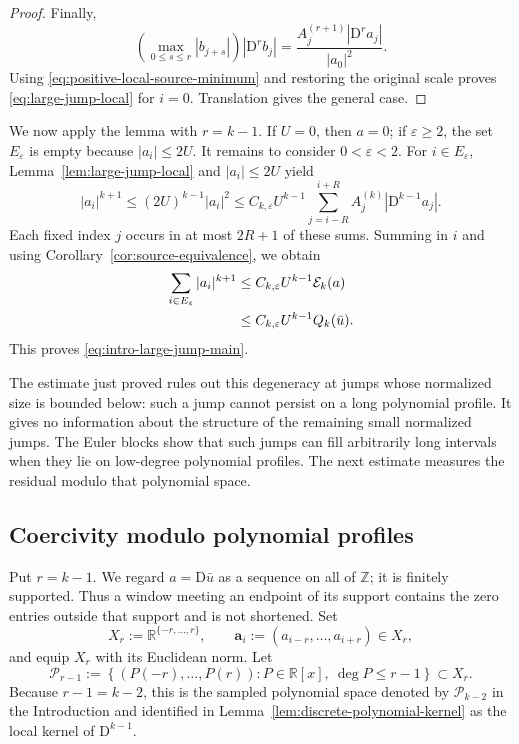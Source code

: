 \documentclass[11pt]{amsart}
\theoremstyle{plain}
\theoremstyle{definition}
\theoremstyle{remark}
\numberwithin{equation}{section}
\theoremstyle{plain}
\begin{document}
\begin{proof}
	Finally,
	\[
	\left(\max_{0\le s\le r}|b_{j+s}|\right)|\mathrm D^rb_j|
	=\frac{A_j^{(r+1)}|\mathrm D^ra_j|}{|a_0|^2}.
	\]
	Using \eqref{eq:positive-local-source-minimum} and restoring the original
	scale proves \eqref{eq:large-jump-local} for $i=0$.  Translation gives the
	general case.
\end{proof}

We now apply the lemma with $r=k-1$.  If $U=0$, then $a=0$; if
$\varepsilon\ge2$, the set $E_\varepsilon$ is empty because
$|a_i|\le2U$.  It remains to consider $0<\varepsilon<2$.  For
$i\in E_\varepsilon$, Lemma~\ref{lem:large-jump-local} and
$|a_i|\le2U$ yield
\[
|a_i|^{k+1}
\le (2U)^{k-1}|a_i|^2
\le C_{k,\varepsilon}U^{k-1}
\sum_{j=i-R}^{i+R}
A_j^{(k)}|\mathrm D^{k-1}a_j|.
\]
Each fixed index $j$ occurs in at most $2R+1$ of these sums.  Summing in
$i$ and using Corollary~\ref{cor:source-equivalence}, we obtain
\begin{align}
	\sum_{i\in E_\varepsilon}|a_i|^{k+1}
	&\le C_{k,\varepsilon}U^{k-1}\mathcal E_k(a)
	\notag\\
	&\le C_{k,\varepsilon}U^{k-1}Q_k(\bar u).
	\label{eq:large-jump-coercivity-section5}
\end{align}
This proves \eqref{eq:intro-large-jump-main}.

The estimate just proved rules out this degeneracy at jumps whose
normalized size is bounded below: such a jump cannot persist on a long
polynomial profile.
It gives no information about the structure of the remaining small
normalized jumps.  The Euler blocks show that such jumps can fill arbitrarily
long intervals when they lie on low-degree polynomial profiles.  The next
estimate measures the residual modulo that polynomial space.

\subsection{Coercivity modulo polynomial profiles}
\label{sec:quotient-coercivity}

Put $r=k-1$.  We regard $a=\mathrm D\bar u$ as a sequence on all of
$\mathbb Z$; it is finitely supported.  Thus a window meeting an endpoint
of its support contains the zero entries outside that support and is not
shortened.  Set
\begin{equation}\label{eq:local-block-space}
	X_r:=\mathbb R^{\{-r,\ldots,r\}},
	\qquad
	\mathbf a_i:=(a_{i-r},\ldots,a_{i+r})\in X_r,
\end{equation}
and equip $X_r$ with its Euclidean norm.  Let
\begin{equation}\label{eq:sampled-polynomial-subspace-section5}
	\mathcal P_{r-1}
	:=\left\{(P(-r),\ldots,P(r)):
	P\in\mathbb R[x],\ \deg P\le r-1\right\}
	\subset X_r.
\end{equation}
Because $r-1=k-2$, this is the sampled polynomial space denoted by
$\mathcal P_{k-2}$ in the Introduction and identified in
Lemma~\ref{lem:discrete-polynomial-kernel} as the local kernel of
$\mathrm D^{k-1}$.
\end{document}
